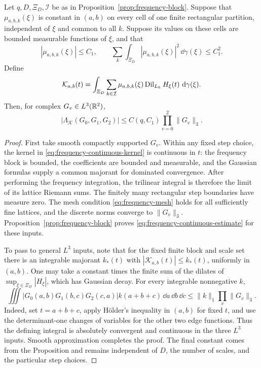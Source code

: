 \begin{corollary}
\label{cor:frequency-continuum}
Let $q,D,\Xi_D,\mathcal I$ be as in
Proposition~\ref{prop:frequency-block}.  Suppose that
$\mu_{a,b,k}(\xi)$ is constant in $(a,b)$ on every cell of one
finite rectangular partition, independent of $\xi$ and common to
all $k$.  Suppose its values on these cells are bounded measurable
functions of $\xi$, and that
\begin{equation}\label{eq:frequency-continuous-condition}
 |\mu_{a,b,k}(\xi)|\leq C_1,
 \qquad
 \sum_k\int_{\Xi_D}|\mu_{a,b,k}(\xi)|^2\,\dd\gamma(\xi)
 \leq C_1^2.
\end{equation}
Define
\begin{equation}\label{eq:frequency-continuous-kernel}
 \mathcal K_{a,b}(t)
   =\int_{\Xi_D}\sum_{k\in\mathcal I}
          \mu_{a,b,k}(\xi)\operatorname{Dil}_{L_k}H_\xi(t)\,\,\mathrm d\gamma(\xi).
\end{equation}
Then, for complex $G_v\in L^3(\mathbb R^2)$,
\begin{equation}\label{eq:frequency-continuous-estimate}
 |\Lambda_{\mathcal K}(G_0,G_1,G_2)|
       \leq C(q,C_1)\prod_{v=0}^2\|G_v\|_3.
\end{equation}
\end{corollary}

\begin{proof}
First take smooth compactly supported $G_v$.  Within any fixed
step choice, the kernel in
\eqref{eq:frequency-continuous-kernel} is continuous in $t$:
the frequency block is bounded, the coefficients are bounded and
measurable, and the Gaussian formulas supply a common majorant
for dominated convergence.  After performing the frequency
integration, the trilinear integral is therefore the limit of
its lattice Riemann sums.  The finitely many rectangular step
boundaries have measure zero.  The mesh condition
\eqref{eq:frequency-mesh} holds for all sufficiently fine lattices,
and the discrete norms converge to $\|G_v\|_3$.
Proposition~\ref{prop:frequency-block} proves
\eqref{eq:frequency-continuous-estimate} for these inputs.

To pass to general $L^3$ inputs, note that for the fixed finite
block and scale set there is an integrable majorant $k_*(t)$
with $|\mathcal K_{a,b}(t)|\leq k_*(t)$, uniformly in $(a,b)$.
One may take a constant times the finite sum of the dilates of
$\sup_{\xi\in\Xi_D}|H_\xi|$, which has Gaussian decay.
For every integrable nonnegative $k$,
\[
 \iiint |G_0(a,b)G_1(b,c)G_2(c,a)|k(a+b+c)
                         \,\dd a\,\dd b\,\dd c
 \leq\|k\|_1\prod_v\|G_v\|_3.
\]
Indeed, set $t=a+b+c$, apply H\"older's inequality in $(a,b)$
for fixed $t$, and use the determinant-one changes of variables
for the other two edge functions.  Thus the defining integral
is absolutely convergent and continuous in the three $L^3$
inputs.  Smooth approximation completes the proof.  The final
constant comes from the Proposition and remains independent of
$D$, the number of scales, and the particular step choices.
\end{proof}
